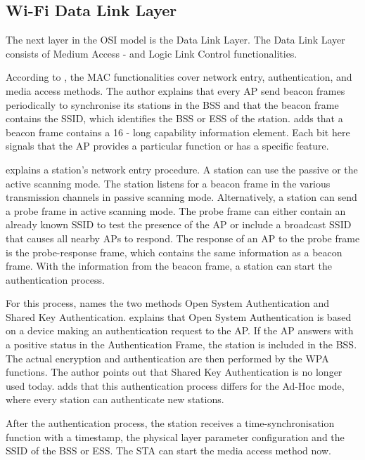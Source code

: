 \subsection*{Wi-Fi Data Link Layer}

The next layer in the OSI model is the Data Link Layer.
The Data Link Layer consists of Medium Access - and Logic Link Control functionalities.


According to \textcite{kauffels_wireless_2002}, the MAC functionalities cover network entry, authentication, and media access methods.
The author explains that every \ac{AP} send beacon frames periodically to synchronise its stations in the \ac{BSS} and that the beacon frame contains the \ac{SSID}, which identifies the \ac{BSS} or \ac{ESS} of the station. \textcite{sauter_wireless_2022} adds that a beacon frame contains a \SI{16}{\bit} - long capability information element. Each bit here signals that the \ac{AP} provides a particular function or has a specific feature.

\textcite{kauffels_wireless_2002} explains a station's network entry procedure.
A station can use the passive or the active scanning mode.
The station listens for a beacon frame in the various transmission channels in passive scanning mode.
Alternatively, a station can send a probe frame in active scanning mode.
The probe frame can either contain an already known \ac{SSID} to test the presence of the \ac{AP} or include a broadcast SSID that causes all nearby \ac{AP}s to respond.
The response of an \ac{AP} to the probe frame is the probe-response frame, which contains the same information as a beacon frame.
With the information from the beacon frame, a station can start the authentication process.

For this process, \textcite{kauffels_wireless_2002} names the two methods Open System Authentication and Shared Key Authentication.
\textcite{sauter_wireless_2022} explains that Open System Authentication is based on a device making an authentication
request to the \ac{AP}.
If the \ac{AP} answers with a positive status in the Authentication Frame,
the station is included in the \ac{BSS}.
The actual encryption and authentication are then performed by the \ac{WPA} functions.
The author points out that Shared Key Authentication is no longer used today.
\textcite{sommer_vehicular_2014} adds that this authentication process differs for the Ad-Hoc mode, where every station can
authenticate new stations.

After the authentication process, the station receives a time-synchronisation function with a timestamp, the physical layer
parameter configuration and the \ac{SSID} of the \ac{BSS} or \ac{ESS}.
The \ac{STA} can start the media access method now.

